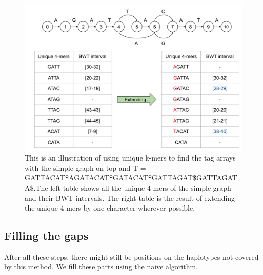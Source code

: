 \documentclass[11pt]{ucthesis}
\begin{document}
\begin{figure}[h]
    \centering
    \includegraphics[width=\linewidth]{Images/Unique kmers.pdf}
    \caption[Unique k-mers algorithm example]{This is an illustration of using unique k-mers to find the tag arrays with the simple graph on top and T = GATTACAT\$AGATACAT\$GATACAT\$GATTAGAT\$GATTAGATA\$.The left table shows all the unique 4-mers of the simple graph and their BWT intervals. The right table is the result of extending the unique 4-mers by one character wherever possible. 
}
    \label{fig:2:6}
\end{figure}

\subsection{Filling the gaps}
After all these steps, there might still be positions on the haplotypes not covered by this method. We fill these parts using the naive algorithm. 
\end{document}
